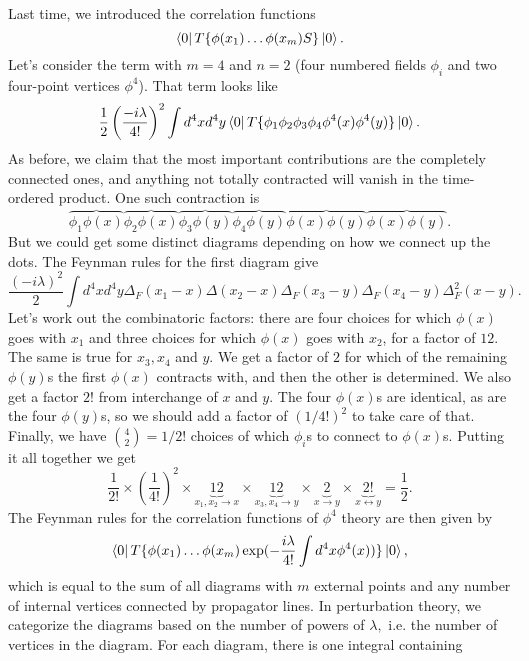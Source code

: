 
Last time, we introduced the correlation functions
$$\left< 0 \right|T\{\phi(x_1)\ldots \phi(x_m) S\}\left| 0 \right>.$$
Let's consider the term with $m=4$ and $n=2$ (four numbered fields $\phi_i$ and two four-point vertices $\phi^4$). That term looks like
$$\frac{1}{2} \left(\frac{-i\lambda}{4!}\right)^2 \int d^4x d^4 y \left< 0 \right|T\{\phi_1 \phi_2 \phi_3 \phi_4 \phi^4(x) \phi^4(y)\}\left| 0 \right>.$$
As before, we claim that the most important contributions are the completely connected ones, and anything not totally contracted will vanish in the time-ordered product. One such contraction is
$$\overbrace{\phi_1 \phi(x)}\overbrace{\phi_2 \phi(x)} \overbrace{\phi_3 \phi(y)} \overbrace{\phi_4 \phi(y)} \overbrace{\phi(x)\phi(y)}\overbrace{\phi(x)\phi(y)}.$$
But we could get some distinct diagrams depending on how we connect up the dots. The Feynman rules for the first diagram%
give
$$\frac{(-i\lambda)^2}{2}\int d^4x d^4 y \Delta_F(x_1-x)\Delta (x_2-x)\Delta_F(x_3-y) \Delta_F(x_4-y) \Delta_F^2(x-y).$$
Let's work out the combinatoric factors: there are four choices for which $\phi(x)$ goes with $x_1$ and three choices for which $\phi(x)$ goes with $x_2$, for a factor of $12$. The same is true for $x_3,x_4$ and $y$. We get a factor of $2$ for which of the remaining $\phi(y)$s the first $\phi(x)$ contracts with, and then the other is determined. We also get a factor $2!$ from interchange of $x$ and $y$. The four $\phi(x)$s are identical, as are the four $\phi(y)$s, so we should add a factor of $(1/4!)^2$ to take care of that. Finally, we have ${4\choose 2}=1/2!$ choices of which $\phi_i$s to connect to $\phi(x)$s. Putting it all together we get
$$\frac{1}{2!}\times \left(\frac{1}{4!}\right)^2 \times \underbrace{12}_{x_1,x_2\to x} \times \underbrace{12}_{x_3,x_4\to y} \times \underbrace{2}_{x\to y} \times \underbrace{2!}_{x\leftrightarrow y} = \frac{1}{2}.$$
The Feynman rules for the correlation functions of $\phi^4$ theory are then given by
$$\left< 0 \right|T\{\phi(x_1)\ldots \phi(x_m)  \exp(-\frac{i\lambda}{4!}\int d^4x \phi^4 (x))\}\left| 0 \right>,$$ which is equal to the sum of all diagrams with $m$ external points and any number of internal vertices connected by propagator lines. In perturbation theory, we categorize the diagrams based on the number of powers of $\lambda,$ i.e. the number of vertices in the diagram. For each diagram, there is one integral containing
